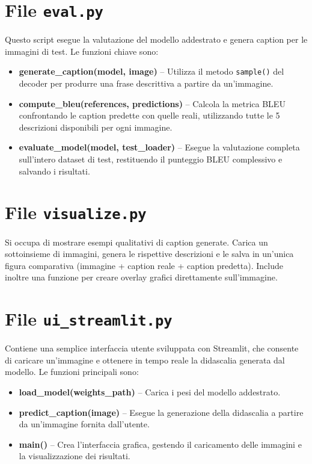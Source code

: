 \documentclass[11pt,a4paper]{report}
\begin{document}
\section{File \texttt{eval.py}}

Questo script esegue la valutazione del modello addestrato e genera caption per le immagini di test.  
Le funzioni chiave sono:

\begin{itemize}
  \item \textbf{generate\_caption(model, image)} – Utilizza il metodo \texttt{sample()} del decoder per produrre una frase descrittiva a partire da un’immagine.
  \item \textbf{compute\_bleu(references, predictions)} – Calcola la metrica BLEU confrontando le caption predette con quelle reali, utilizzando tutte le 5 descrizioni disponibili per ogni immagine.
  \item \textbf{evaluate\_model(model, test\_loader)} – Esegue la valutazione completa sull’intero dataset di test, restituendo il punteggio BLEU complessivo e salvando i risultati.
\end{itemize}

\section{File \texttt{visualize.py}}

Si occupa di mostrare esempi qualitativi di caption generate.  
Carica un sottoinsieme di immagini, genera le rispettive descrizioni e le salva in un’unica figura comparativa (immagine + caption reale + caption predetta).  
Include inoltre una funzione per creare overlay grafici direttamente sull’immagine.

\section{File \texttt{ui\_streamlit.py}}

Contiene una semplice interfaccia utente sviluppata con Streamlit, che consente di caricare un’immagine e ottenere in tempo reale la didascalia generata dal modello.  
Le funzioni principali sono:

\begin{itemize}
  \item \textbf{load\_model(weights\_path)} – Carica i pesi del modello addestrato.
  \item \textbf{predict\_caption(image)} – Esegue la generazione della didascalia a partire da un’immagine fornita dall’utente.
  \item \textbf{main()} – Crea l’interfaccia grafica, gestendo il caricamento delle immagini e la visualizzazione dei risultati.
\end{itemize}
\end{document}
